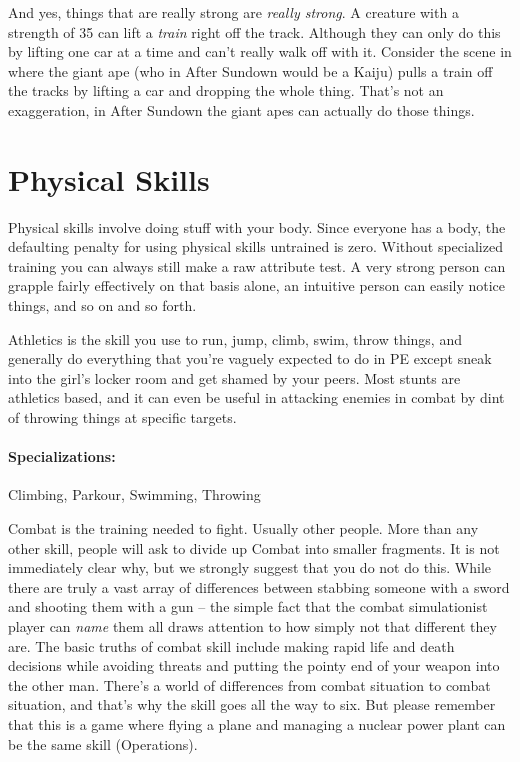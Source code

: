 And yes, things that are really strong are \textit{really strong}. A creature with a strength of 35 can lift a \textit{train} right off the track. Although they can only do this by lifting one car at a time and can't really walk off with it. Consider the scene in  where the giant ape (who in After Sundown would be a Kaiju) pulls a train off the tracks by lifting a car and dropping the whole thing. That's not an exaggeration, in After Sundown the giant apes can actually do those things.


\section{Physical Skills}

\hspace{\parindent} Physical skills involve doing stuff with your body. Since everyone has a body, the defaulting penalty for using physical skills untrained is zero. Without specialized training you can always still make a raw attribute test. A very strong person can grapple fairly effectively on that basis alone, an intuitive person can easily notice things, and so on and so forth.


\hspace{\parindent} Athletics is the skill you use to run, jump, climb, swim, throw things, and generally do everything that you're vaguely expected to do in PE except sneak into the girl's locker room and get shamed by your peers. Most stunts are athletics based, and it can even be useful in attacking enemies in combat by dint of throwing things at specific targets.

\paragraph{Specializations:} Climbing, Parkour, Swimming, Throwing


\hspace{\parindent} Combat is the training needed to fight. Usually other people. More than any other skill, people will ask to divide up Combat into smaller fragments. It is not immediately clear why, but we strongly suggest that you do not do this. While there are truly a vast array of differences between stabbing someone with a sword and shooting them with a gun -- the simple fact that the combat simulationist player can \textit{name} them all draws attention to how simply not that different they are. The basic truths of combat skill include making rapid life and death decisions while avoiding threats and putting the pointy end of your weapon into the other man. There's a world of differences from combat situation to combat situation, and that's why the skill goes all the way to six. But please remember that this is a game where flying a plane and managing a nuclear power plant can be the same skill (Operations).

